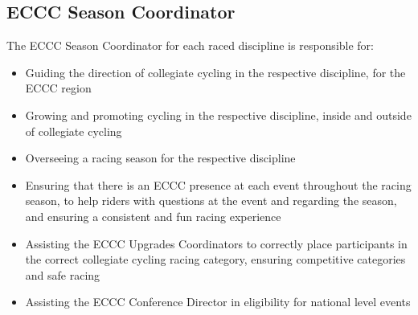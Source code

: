 \subsection{ECCC Season Coordinator}
\label{role:eccc_season_coordinator}

The ECCC Season Coordinator for each raced discipline is responsible for:
\begin{itemize}
  \item Guiding the direction of collegiate cycling in the respective discipline, for the ECCC region
  \item Growing and promoting cycling in the respective discipline, inside and outside of collegiate cycling
  \item Overseeing a racing season for the respective discipline
  \item Ensuring that there is an ECCC presence at each event throughout the racing season,
    to help riders with questions at the event and regarding the season,
    and ensuring a consistent and fun racing experience
  \item Assisting the ECCC Upgrades Coordinators to correctly place participants in the correct collegiate cycling racing category,
    ensuring competitive categories and safe racing
  \item Assisting the ECCC Conference Director in eligibility for national level events
\end{itemize}
